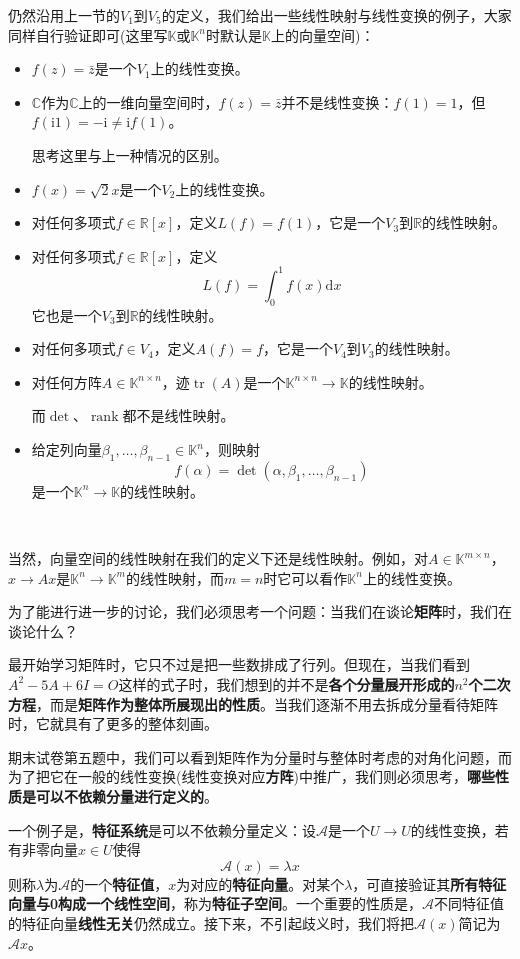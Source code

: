 \documentclass[a4paper,UTF8,fontset=windows,AutoFakeBold]{ctexart}
\DeclareMathOperator{\rank}{rank}
\DeclareMathOperator{\tr}{tr}
\newcommand*{\ir}{\mathrm{i}}
\newcommand*{\ma}{\mathcal{A}}
\newcommand*{\note}{\noindent *}
\begin{document}
仍然沿用上一节的$V_1$到$V_5$的定义，我们给出一些线性映射与线性变换的例子，大家同样自行验证即可(这里写$\mathbb{K}$或$\mathbb{K}^n$时默认是$\mathbb{K}$上的向量空间)：
\begin{itemize}
    \item $f(z)=\bar{z}$是一个$V_1$上的线性变换。
    \item $\mathbb{C}$作为$\mathbb{C}$上的一维向量空间时，$f(z)=\bar{z}$并不是线性变换：$f(1)=1$，但$f(\ir1)=-\ir\ne\ir f(1)$。
    
    \note 思考这里与上一种情况的区别。
    \item $f(x)=\sqrt2 x$是一个$V_2$上的线性变换。
    \item 对任何多项式$f\in\mathbb{R}[x]$，定义$L(f)=f(1)$，它是一个$V_3$到$\mathbb{R}$的线性映射。
    \item 对任何多项式$f\in\mathbb{R}[x]$，定义
    $$L(f)=\int_0^1f(x)\mathrm{d}x$$
    它也是一个$V_3$到$\mathbb{R}$的线性映射。
    \item 对任何多项式$f\in V_4$，定义$A(f)=f$，它是一个$V_4$到$V_3$的线性映射。
    \item 对任何方阵$A\in\mathbb{K}^{n\times n}$，迹$\tr(A)$是一个$\mathbb{K}^{n\times n}\to\mathbb{K}$的线性映射。
    
    \note 而$\det$、$\rank$都不是线性映射。
    \item 给定列向量$\beta_1,\dots,\beta_{n-1}\in\mathbb{K}^n$，则映射
    $$f(\alpha)=\det(\alpha,\beta_1,\dots,\beta_{n-1})$$
    是一个$\mathbb{K}^n\to\mathbb{K}$的线性映射。
\end{itemize}

\

当然，向量空间的线性映射在我们的定义下还是线性映射。例如，对$A\in\mathbb{K}^{m\times n}$，$x\to Ax$是$\mathbb{K}^n\to\mathbb{K}^m$的线性映射，而$m=n$时它可以看作$\mathbb{K}^n$上的线性变换。

为了能进行进一步的讨论，我们必须思考一个问题：当我们在谈论\textbf{矩阵}时，我们在谈论什么？

最开始学习矩阵时，它只不过是把一些数排成了行列。但现在，当我们看到$A^2-5A+6I=O$这样的式子时，我们想到的并不是\textbf{各个分量展开形成的$n^2$个二次方程}，而是\textbf{矩阵作为整体所展现出的性质}。当我们逐渐不用去拆成分量看待矩阵时，它就具有了更多的整体刻画。

期末试卷第五题中，我们可以看到矩阵作为分量时与整体时考虑的对角化问题，而为了把它在一般的线性变换(线性变换对应\textbf{方阵})中推广，我们则必须思考，\textbf{哪些性质是可以不依赖分量进行定义的}。

一个例子是，\textbf{特征系统}是可以不依赖分量定义：设$\ma$是一个$U\to U$的线性变换，若有非零向量$x\in U$使得
$$\ma(x)=\lambda x$$
则称$\lambda$为$\ma$的一个\textbf{特征值}，$x$为对应的\textbf{特征向量}。对某个$\lambda$，可直接验证其\textbf{所有特征向量与0构成一个线性空间}，称为\textbf{特征子空间}。一个重要的性质是，$\mathcal{A}$不同特征值的特征向量\textbf{线性无关}仍然成立。接下来，不引起歧义时，我们将把$\ma(x)$简记为$\ma x$。
\end{document}
